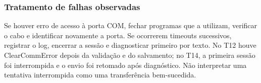 \subsubsection*{Tratamento de falhas observadas}
Se houver erro de acesso à porta COM, fechar programas que a utilizam, verificar o cabo e identificar novamente a porta. Se ocorrerem timeouts sucessivos, registrar o log, encerrar a sessão e diagnosticar primeiro por texto. No T12 houve ClearCommError depois da validação e do salvamento; no T14, a primeira sessão foi interrompida e o envio foi retomado após diagnóstico. Não interpretar uma tentativa interrompida como uma transferência bem-sucedida.

